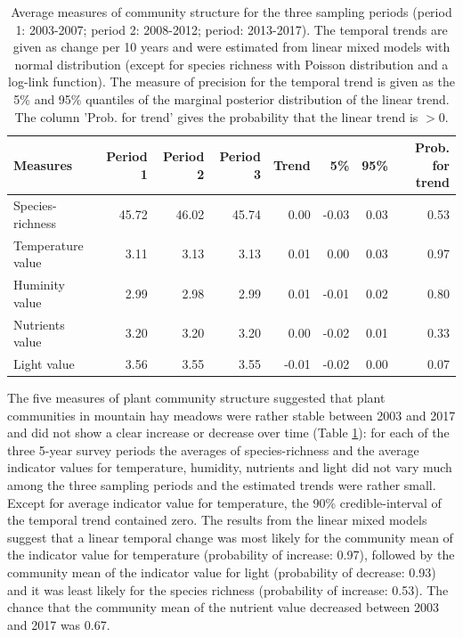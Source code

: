 \documentclass[fleqn,10pt,lineno]{wlpeerj} %
\theoremstyle{definition}
\theoremstyle{definition}
\theoremstyle{definition}
\theoremstyle{remark}
\begin{document}
\begin{table}

\caption{\label{tab:communitytrendstab}Average measures of community structure for the three sampling periods (period 1: 2003-2007; period 2: 2008-2012; period: 2013-2017). The temporal trends are given as change per 10 years and were estimated from linear mixed models with normal distribution (except for species richness with Poisson distribution and a log-link function). The measure of precision for the temporal trend is given as the 5\% and 95\% quantiles of the marginal posterior distribution of the linear trend. The column 'Prob. for trend' gives the probability that the linear trend is $> 0$.}
\centering
\begin{tabular}[t]{lrrrrrrr}
\toprule
Measures & Period 1 & Period 2 & Period 3 & Trend & 5\% & 95\% & Prob. for trend\\
\midrule
Species-richness & 45.72 & 46.02 & 45.74 & 0.00 & -0.03 & 0.03 & 0.53\\
Temperature value & 3.11 & 3.13 & 3.13 & 0.01 & 0.00 & 0.03 & 0.97\\
Huminity value & 2.99 & 2.98 & 2.99 & 0.01 & -0.01 & 0.02 & 0.80\\
Nutrients value & 3.20 & 3.20 & 3.20 & 0.00 & -0.02 & 0.01 & 0.33\\
Light value & 3.56 & 3.55 & 3.55 & -0.01 & -0.02 & 0.00 & 0.07\\
\bottomrule
\end{tabular}
\end{table}

The five measures of plant community structure suggested that plant
communities in mountain hay meadows were rather stable between 2003 and
2017 and did not show a clear increase or decrease over time (Table
\ref{tab:communitytrendstab}): for each of the three 5-year survey
periods the averages of species-richness and the average indicator
values for temperature, humidity, nutrients and light did not vary much
among the three sampling periods and the estimated trends were rather
small. Except for average indicator value for temperature, the 90\%
credible-interval of the temporal trend contained zero. The results from
the linear mixed models suggest that a linear temporal change was most
likely for the community mean of the indicator value for temperature
(probability of increase: 0.97), followed by the community mean of the
indicator value for light (probability of decrease: 0.93) and it was
least likely for the species richness (probability of increase: 0.53).
The chance that the community mean of the nutrient value decreased
between 2003 and 2017 was 0.67.
\end{document}
